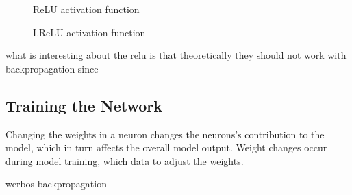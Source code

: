\begin{figure}[h]
	\centering
	\begin{minipage}[t]{0.45\textwidth}
		\centering
		
		\caption[ReLU activation function]{ReLU activation function}
		\label{fig:2305_relu_activation_function}
	\end{minipage}
	\hspace{1cm}
	\begin{minipage}[t]{0.45\textwidth}
		\centering
		
		\caption[LReLU activation function]{LReLU activation function}
		\label{fig:2306_lrelu_activation_function}
	\end{minipage}
\end{figure}

 

what is interesting about the relu is that theoretically they should not work with backpropagation since 



\subsection{Training the Network} \label{sec:networktraining}
Changing the weights in a neuron changes the neurons’s contribution to the model, which in turn affects the overall model output. Weight changes occur during model training, which data to adjust the weights.

werbos backpropagation